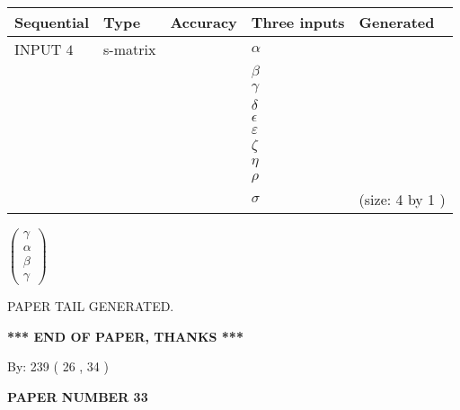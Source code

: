 \documentclass[12pt]{article}
\begin{document}
  
\noindent\begin{tabular}{|l|l|l|l|l|}
\hline
 Sequential & Type & Accuracy & Three inputs & Generated \\ 
\hline
 
 
  INPUT $  4 $ & s-matrix & & 
 $  \alpha $ & 
  \\
  & & & 
 $  \beta $ & 
  \\
  & & & 
 $  \gamma $ & 
  \\
  & & & 
 $  \delta $ & 
  \\
  & & & 
 $  \epsilon $ & 
  \\
  & & & 
 $  \varepsilon $ & 
  \\
  & & & 
 $                     \zeta $ & 
  \\
  & & & 
 $  \eta $ & 
  \\
  & & & 
 $  \rho $ & 
  \\
  & & & 
 $  \sigma $ & 
  (size:  4  by  1 )
 \\  \hline  
 \end{tabular}
   
   
 $  \left( \begin{array}
 {
 c
 }
 \gamma \\ 
 \alpha \\ 
 \beta \\ 
 \gamma
 \end{array} \right) $ 
   
   
   
   
 \vspace{0.2in}
 
   
   
\vspace{2.0in} PAPER TAIL GENERATED.
   
   
   
   
\vspace{1.0in} 
{\textbf{\large{ *** END OF PAPER, THANKS *** }}} 
   
   
\hspace{1.0in} By: 
 239 ( 26 ,  34 )
   
   
   
   
\newpage 
\setcounter{page}{ 
    33001 } 
   
   
   
   
 {\textbf{ \Large{ PAPER NUMBER  33  }}}
   
   
\vspace{0.2in}
   
   
   
\end{document}
